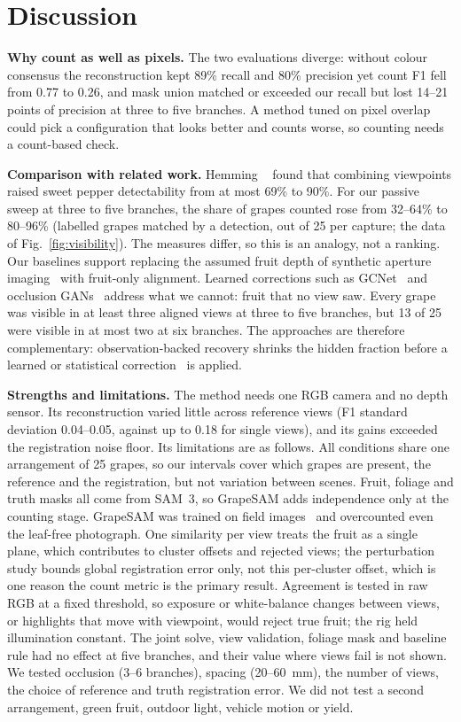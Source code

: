 \section{Discussion}
\textbf{Why count as well as pixels.} The two evaluations diverge: without colour consensus the reconstruction kept 89\% recall and 80\% precision yet count F1 fell from 0.77 to 0.26, and mask union matched or exceeded our recall but lost 14--21 points of precision at three to five branches. A method tuned on pixel overlap could pick a configuration that looks better and counts worse, so counting needs a count-based check.

\textbf{Comparison with related work.} Hemming \etal~\cite{hemming2014} found that combining viewpoints raised sweet pepper detectability from at most 69\% to 90\%. For our passive sweep at three to five branches, the share of grapes counted rose from 32--64\% to 80--96\% (labelled grapes matched by a detection, out of 25 per capture; the data of Fig.~\ref{fig:visibility}). The measures differ, so this is an analogy, not a ranking. Our baselines support replacing the assumed fruit depth of synthetic aperture imaging~\cite{vaish2006,kurmi2018} with fruit-only alignment. Learned corrections such as GCNet~\cite{quinones2025gcnet} and occlusion GANs~\cite{kierdorf2022} address what we cannot: fruit that no view saw. Every grape was visible in at least three aligned views at three to five branches, but 13 of 25 were visible in at most two at six branches. The approaches are therefore complementary: observation-backed recovery shrinks the hidden fraction before a learned or statistical correction~\cite{millan2018,nuske2014} is applied.

\textbf{Strengths and limitations.} The method needs one RGB camera and no depth sensor. Its reconstruction varied little across reference views (F1 standard deviation 0.04--0.05, against up to 0.18 for single views), and its gains exceeded the registration noise floor. Its limitations are as follows. All conditions share one arrangement of 25 grapes, so our intervals cover which grapes are present, the reference and the registration, but not variation between scenes. Fruit, foliage and truth masks all come from SAM~3, so GrapeSAM adds independence only at the counting stage. GrapeSAM was trained on field images~\cite{tong2026vivid} and overcounted even the leaf-free photograph. One similarity per view treats the fruit as a single plane, which contributes to cluster offsets and rejected views; the perturbation study bounds global registration error only, not this per-cluster offset, which is one reason the count metric is the primary result. Agreement is tested in raw RGB at a fixed threshold, so exposure or white-balance changes between views, or highlights that move with viewpoint, would reject true fruit; the rig held illumination constant. The joint solve, view validation, foliage mask and baseline rule had no effect at five branches, and their value where views fail is not shown. We tested occlusion (3--6 branches), spacing (20--60~mm), the number of views, the choice of reference and truth registration error. We did not test a second arrangement, green fruit, outdoor light, vehicle motion or yield.

